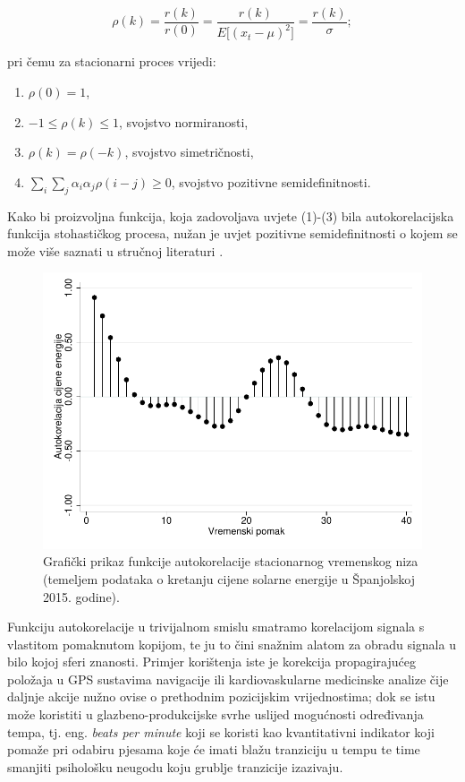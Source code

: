 \documentclass[a4paper,12pt,oneside]{memoir}
\begin{document}
                \begin{equation}
                    \rho(k)=\frac{r(k)}{r(0)}=\frac{r(k)}{E\big[(x_t-\mu)^2\big]}=\frac{r(k)}{\sigma};
                    \label{autocorrelation}
                \end{equation}

                pri čemu za stacionarni proces vrijedi\cite{Bahovec}:

                \begin{enumerate}
                    \item $\rho(0)=1$,
                    \item $-1\leq \rho(k)\leq 1$, \quad svojstvo normiranosti,
                    \item $\rho(k)=\rho(-k)$, \quad svojstvo simetričnosti,
                    \item $\displaystyle\sum_i\sum_j\alpha_i\alpha_j\rho(i-j)\geq0$, \quad svojstvo pozitivne semidefinitnosti.
                \end{enumerate}

                Kako bi proizvoljna funkcija, koja zadovoljava uvjete (1)-(3) bila autokorelacijska funkcija stohastičkog procesa, nužan je uvjet pozitivne semidefinitnosti o kojem se može više saznati u stručnoj literaturi \cite{Priestley}.

                \begin{figure}[H]
                    \centering
                    \includegraphics[width=.75\linewidth]{graphs/price_autocorrelations.pdf}
                    \caption{Grafički prikaz funkcije autokorelacije stacionarnog vremenskog niza (temeljem podataka o kretanju cijene solarne energije u Španjolskoj 2015. godine).}
                \end{figure}

                Funkciju autokorelacije u trivijalnom smislu smatramo korelacijom signala s vlastitom pomaknutom kopijom, te ju to čini snažnim alatom za obradu signala u bilo kojoj sferi znanosti. Primjer korištenja iste je korekcija propagirajućeg položaja u GPS sustavima navigacije ili kardiovaskularne medicinske analize čije daljnje akcije nužno ovise o prethodnim pozicijskim vrijednostima; dok se istu može koristiti u glazbeno-produkcijske svrhe uslijed mogućnosti određivanja tempa, tj. eng. \textit{beats per minute} koji se koristi kao kvantitativni indikator koji pomaže pri odabiru pjesama koje će imati blažu tranziciju u tempu te time smanjiti psihološku neugodu koju grublje tranzicije izazivaju.
\end{document}
